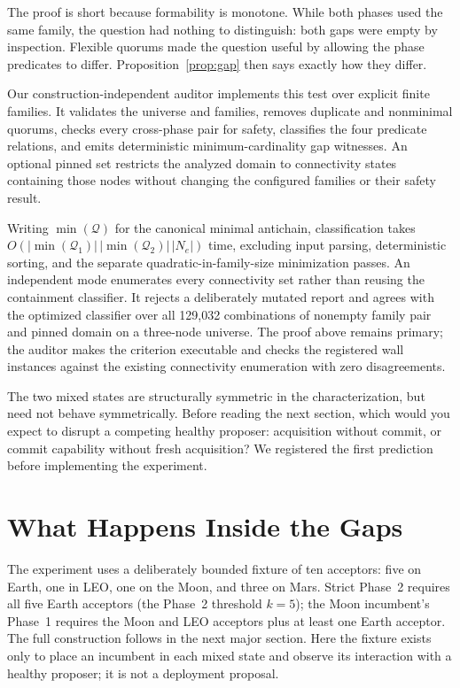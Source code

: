 \documentclass[letterpaper,twocolumn,10pt]{article}
\newcounter{prop}
\begin{document}
The proof is short because formability is monotone. While both phases used the same family, the question had nothing to distinguish: both gaps were empty by inspection. Flexible quorums made the question useful by allowing the phase predicates to differ. Proposition~\ref{prop:gap} then says exactly how they differ.

Our construction-independent auditor implements this test over explicit finite families. It validates the universe and families, removes duplicate and nonminimal quorums, checks every cross-phase pair for safety, classifies the four predicate relations, and emits deterministic minimum-cardinality gap witnesses. An optional pinned set restricts the analyzed domain to connectivity states containing those nodes without changing the configured families or their safety result.

Writing $\min(\mathcal{Q})$ for the canonical minimal antichain, classification takes $O(|\min(\mathcal{Q}_1)|\,|\min(\mathcal{Q}_2)|\,|N_e|)$ time, excluding input parsing, deterministic sorting, and the separate quadratic-in-family-size minimization passes. An independent mode enumerates every connectivity set rather than reusing the containment classifier. It rejects a deliberately mutated report and agrees with the optimized classifier over all 129{,}032 combinations of nonempty family pair and pinned domain on a three-node universe. The proof above remains primary; the auditor makes the criterion executable and checks the registered wall instances against the existing connectivity enumeration with zero disagreements.

The two mixed states are structurally symmetric in the characterization, but need not behave symmetrically. Before reading the next section, which would you expect to disrupt a competing healthy proposer: acquisition without commit, or commit capability without fresh acquisition? We registered the first prediction before implementing the experiment.


\section{What Happens Inside the Gaps}
\label{sec:valence}

The experiment uses a deliberately bounded fixture of ten acceptors: five on Earth, one in LEO, one on the Moon, and three on Mars. Strict Phase~2 requires all five Earth acceptors (the Phase~2 threshold $k=5$); the Moon incumbent's Phase~1 requires the Moon and LEO acceptors plus at least one Earth acceptor. The full construction follows in the next major section. Here the fixture exists only to place an incumbent in each mixed state and observe its interaction with a healthy proposer; it is not a deployment proposal.
\end{document}
